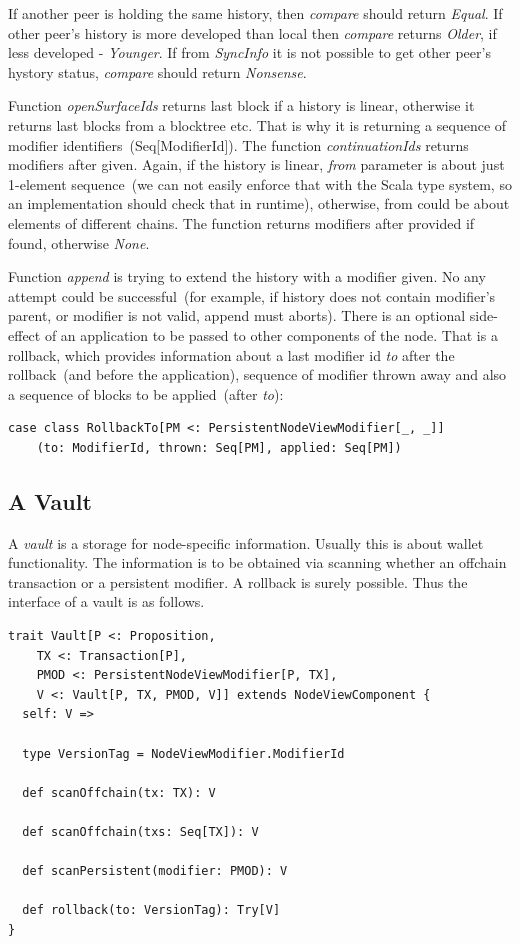 \documentclass[]{report}   %
\begin{document}
If another peer is holding the same history, then \textit{compare} should return \textit{Equal}. If other peer's history is more developed than local then \textit{compare} returns \textit{Older}, if less developed - \textit{Younger}. If from \textit{SyncInfo} it is not possible to get other peer's hystory status, \textit{compare} should return \textit{Nonsense}. 


Function \textit{openSurfaceIds} returns last block if a history is linear, otherwise it returns last blocks from a blocktree etc. That is why it is returning a sequence of modifier identifiers~(Seq[ModifierId]). The function \textit{continuationIds} returns modifiers after given. Again, if the history is linear, \textit{from} parameter is about just 1-element sequence~(we can not easily enforce that with the Scala type system, so an implementation should check that in runtime), otherwise, from could be about elements of different chains. The function returns modifiers after provided if found, otherwise \textit{None}. 

Function \textit{append} is trying to extend the history with a modifier given. No any attempt could be successful~(for example, if history does not contain modifier's parent, or modifier is not valid, append must aborts). There is an optional side-effect of an application to be passed to other components of the node. That is a rollback, which provides information about a last modifier id \textit{to} after the rollback~(and before the application), sequence of modifier thrown away and also a sequence of blocks to be applied~(after \textit{to}):

\begin{lstlisting}
case class RollbackTo[PM <: PersistentNodeViewModifier[_, _]]
	(to: ModifierId, thrown: Seq[PM], applied: Seq[PM])
\end{lstlisting}


\subsection{A Vault}

A \textit{vault} is a storage for node-specific information. Usually this is about wallet functionality. The information is to be obtained via scanning whether an offchain transaction or a persistent modifier. A rollback is surely possible. Thus the interface of a vault is as follows.  

\begin{lstlisting}
trait Vault[P <: Proposition, 
	TX <: Transaction[P],
    PMOD <: PersistentNodeViewModifier[P, TX], 
    V <: Vault[P, TX, PMOD, V]] extends NodeViewComponent {
  self: V =>

  type VersionTag = NodeViewModifier.ModifierId

  def scanOffchain(tx: TX): V

  def scanOffchain(txs: Seq[TX]): V

  def scanPersistent(modifier: PMOD): V

  def rollback(to: VersionTag): Try[V]
}
\end{lstlisting}
\end{document}

